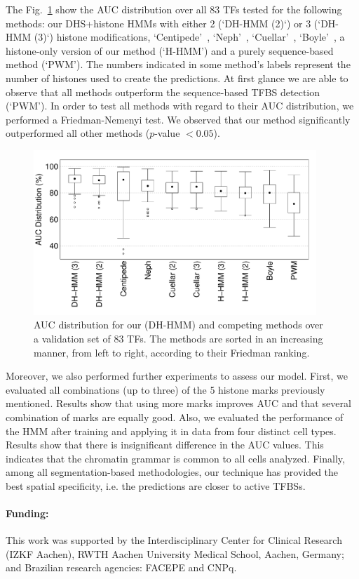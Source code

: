 \documentclass{AbstractTemplate}
\begin{document}
The Fig.~\ref{fig:boxplot} show the AUC distribution over all 83 TFs tested for the following methods: our DHS+histone HMMs with either 2 (`DH-HMM (2)`) or 3 (`DH-HMM (3)`) histone modifications, `Centipede'~\cite{pique2011}, `Neph'~\cite{neph2012a}, `Cuellar'~\cite{cuellar2012}, `Boyle'~\cite{boyle2011}, a histone-only version of our method (`H-HMM') and a purely sequence-based method (`PWM'). The numbers indicated in some method's labels represent the number of histones used to create the predictions. At first glance we are able to observe that all methods outperform the sequence-based TFBS detection (`PWM'). In order to test all methods with regard to their AUC distribution, we performed a Friedman-Nemenyi test. We observed that our method significantly outperformed all other methods ($p$-value $< 0.05$). 
\begin{figure}[h!]
\centering
     \includegraphics[width=0.95\textwidth]{Figure/boxplot}
\caption{AUC distribution for our (DH-HMM) and competing methods over a validation set of 83 TFs. The methods are sorted in an increasing manner, from left to right, according to their Friedman ranking.}
\label{fig:boxplot}
\end{figure}

Moreover, we also performed further experiments to assess our model. First, we evaluated all combinations (up to three) of the 5 histone marks previously mentioned. Results show that using more marks improves AUC and that several combination of marks are equally good. Also, we evaluated the performance of the HMM after training and applying it in data from four distinct cell types. Results show that there is insignificant difference in the AUC values. This indicates that	 the chromatin grammar is common to all cells analyzed. Finally, among all segmentation-based methodologies, our technique has provided the best spatial specificity, i.e. the predictions are closer to active TFBSs.

\paragraph{Funding:}
This work was supported by the Interdisciplinary Center for Clinical Research
(IZKF Aachen), RWTH Aachen University Medical School, Aachen, Germany; and Brazilian research
agencies: FACEPE and CNPq.


{\footnotesize
}
\end{document}
